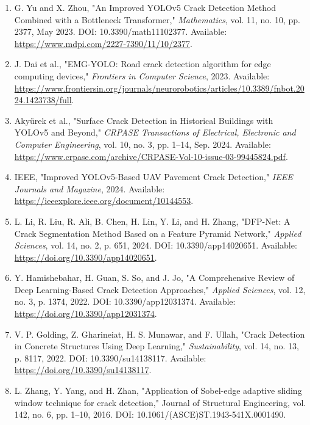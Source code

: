 \documentclass[12pt,a4paper]{article}
\begin{document}
\begin{thebibliography}{99}
\begin{enumerate}
    \item G. Yu and X. Zhou, "An Improved YOLOv5 Crack Detection Method Combined with a Bottleneck Transformer," \textit{Mathematics}, vol. 11, no. 10, pp. 2377, May 2023. DOI: 10.3390/math11102377. Available: \url{https://www.mdpi.com/2227-7390/11/10/2377}.

    \item J. Dai et al., "EMG-YOLO: Road crack detection algorithm for edge computing devices," \textit{Frontiers in Computer Science}, 2023. Available: \url{https://www.frontiersin.org/journals/neurorobotics/articles/10.3389/fnbot.2024.1423738/full}.
    
    \item Akyürek et al., "Surface Crack Detection in Historical Buildings with YOLOv5 and Beyond," \textit{CRPASE Transactions of Electrical, Electronic and Computer Engineering}, vol. 10, no. 3, pp. 1–14, Sep. 2024. Available: \url{https://www.crpase.com/archive/CRPASE-Vol-10-issue-03-99445824.pdf}.
    
    \item IEEE, "Improved YOLOv5-Based UAV Pavement Crack Detection," \textit{IEEE Journals and Magazine}, 2024. Available: \url{https://ieeexplore.ieee.org/document/10144553}.
    
    \item L. Li, R. Liu, R. Ali, B. Chen, H. Lin, Y. Li, and H. Zhang, "DFP-Net: A Crack Segmentation Method Based on a Feature Pyramid Network," \textit{Applied Sciences}, vol. 14, no. 2, p. 651, 2024. DOI: 10.3390/app14020651. Available: \url{https://doi.org/10.3390/app14020651}.
    
    \item Y. Hamishebahar, H. Guan, S. So, and J. Jo, "A Comprehensive Review of Deep Learning-Based Crack Detection Approaches," \textit{Applied Sciences}, vol. 12, no. 3, p. 1374, 2022. DOI: 10.3390/app12031374. Available: \url{https://doi.org/10.3390/app12031374}.
    
    \item V. P. Golding, Z. Gharineiat, H. S. Munawar, and F. Ullah, "Crack Detection in Concrete Structures Using Deep Learning," \textit{Sustainability}, vol. 14, no. 13, p. 8117, 2022. DOI: 10.3390/su14138117. Available: \url{https://doi.org/10.3390/su14138117}.
    
    \item L. Zhang, Y. Yang, and H. Zhan, "Application of Sobel-edge adaptive sliding window technique for crack detection," Journal of Structural Engineering, vol. 142, no. 6, pp. 1–10, 2016. DOI: 10.1061/(ASCE)ST.1943-541X.0001490.


\end{enumerate}
\end{thebibliography}
\end{document}
